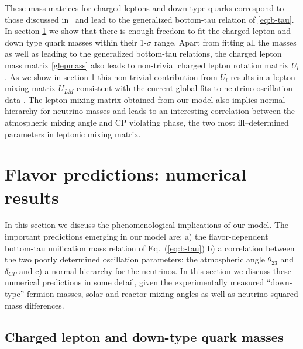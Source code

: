 \documentclass[english,10pt,aps,prd,a4paper,preprintnumbers,floatfix,nofootinbib,showpacs,superscriptaddress]{revtex4-1}
\begin{document}
  These mass matrices for charged leptons and down-type quarks
  correspond to those discussed
  in~\cite{Morisi:2011pt,King:2013hj,Morisi:2013eca,Bonilla:2014xla}
  and lead to the generalized bottom-tau relation of \ref{eq:b-tau}.
%
  In section \ref{sec:numerical-scan} we show that there is enough
  freedom to fit the charged lepton and down type quark masses within
  their 1-$\sigma$ range. Apart from fitting all the masses as well as
  leading to the generalized bottom-tau relations, the charged lepton
  mass matrix \ref{glepmass} also leads to non-trivial charged lepton
  rotation matrix $U_l$.  As we show in section
  \ref{sec:numerical-scan} this non-trivial contribution from $U_l$
  results in a lepton mixing matrix $U_{LM}$ consistent with the
  current global fits to neutrino oscillation data
  \cite{Forero:2014bxa}. The lepton mixing
  matrix obtained from our model also implies normal hierarchy for
  neutrino masses and leads to an interesting correlation between the
  atmospheric mixing angle and CP violating phase, the two most
  ill--determined parameters in leptonic mixing matrix.
  
 \section{Flavor predictions: numerical results}
\label{sec:numerical-scan} 

In this section we discuss the phenomenological implications of our
model.  The important predictions emerging in our model are: a) the
flavor-dependent bottom-tau unification mass relation of
Eq.~(\ref{eq:b-tau}) b) a correlation between the two poorly
determined oscillation parameters: the atmospheric angle $\theta_{23}$
and $\delta_{CP}$ and c) a normal hierarchy for the neutrinos.
%
In this section we discuss these numerical predictions in some detail, 
given the experimentally measured ``down-type'' fermion masses, solar and
reactor mixing angles as well as neutrino squared mass differences.

\subsection{Charged lepton and down-type quark masses}
\label{clmass}
\end{document}
